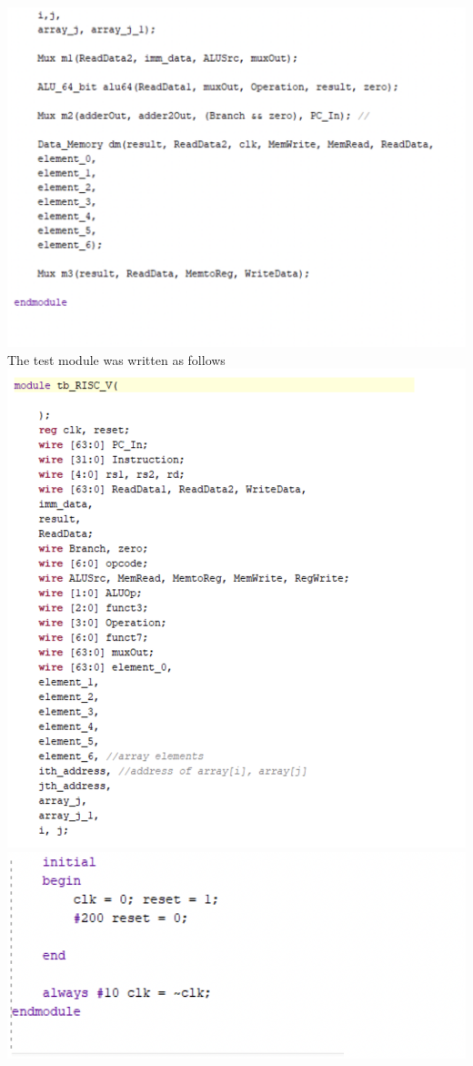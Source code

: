 \documentclass[a4paper, 12pt]{report}
\begin{document}
\\\includegraphics[scale = 0.5]{sc top 3.png}
\\The test module was written as follows
\\\includegraphics[scale = 0.5]{sc test 1.png}
\\\includegraphics[scale = 0.5]{sc test 2.png}
\end{document}
